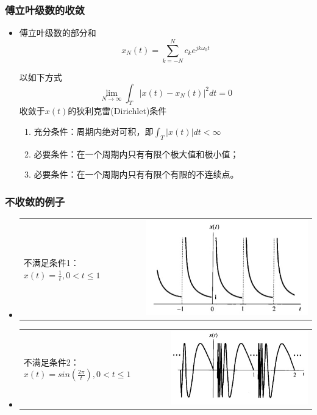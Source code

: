 \documentclass[CJKutf8,xcolor=pdftex,dvipsnames,table]{beamer}
\begin{document}
\begin{CJK*}{UTF8}{song}
  \begin{frame}
    \frametitle{傅立叶级数的收敛}
    \begin{itemize}
        \item 傅立叶级数的部分和\[ x_{N}(t)=\sum_{k=-N}^{N}c_k e^{jk\omega_0 t} \]
		
         以如下方式 \[ \lim_{N\to\infty}\int_{T}|x(t)-x_{N}(t)|^2dt = 0 \] 收敛于$x(t)$的狄利克雷(Dirichlet)条件
        \begin{enumerate}
    		\item 充分条件：周期内绝对可积，即$\int_{T}|x(t)|dt < \infty$
			\item 必要条件：在一个周期内只有有限个极大值和极小值；
			\item 必要条件：在一个周期内只有有限个有限的不连续点。
    	\end{enumerate}
    \end{itemize}      
  \end{frame}
    
  \begin{frame}
    \frametitle{不收敛的例子}    
    \begin{itemize}
    \item
	\begin{tabular}{ll}
	\raisebox{-.5\height}

    不满足条件1：$ x(t)=\frac{1}{t}, 0 < t \leq 1  $

&
    \includegraphics[valign=m,scale=.3]{ss-c-f3-8a}    \\
    \end{tabular}   
    
    \item
	\begin{tabular}{ll}
	\raisebox{-.5\height}

    不满足条件2：$x(t)=sin(\frac{2\pi}{t}), 0 < t \leq 1  $

&
    \includegraphics[valign=m,scale=.3]{ss-c-f3-8b}    \\
    \end{tabular}             
    

\end{itemize}
\end{frame}
\end{CJK*}
\end{document}
